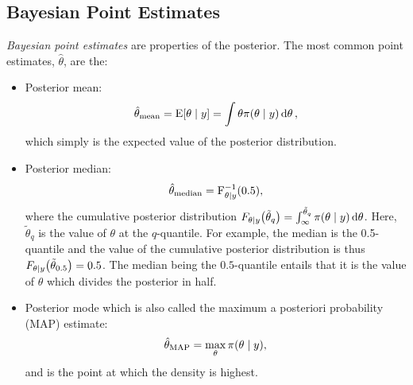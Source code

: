\subsection{Bayesian Point Estimates}

\textit{Bayesian point estimates} are properties of the posterior. The most common point estimates, $\hat{\theta}$, are the:

\begin{itemize}
    \item Posterior mean: 
    \begin{equation}\label{eq:posterior_mean}
        \hat{\theta}_\mathrm{mean} = \mathrm{E} \qty[\theta \mid y] = \int \theta \pi \qty(\theta \mid y) \dd{\theta}, 
    \end{equation}
    which simply is the expected value of the posterior distribution. 
    \item Posterior median: 
    \begin{equation}\label{eq:posterior_median}
        \hat{\theta}_\mathrm{median} = \mathrm{F}_{\theta \mid y}^{-1} \qty(0.5),
    \end{equation}
    where the cumulative posterior distribution $F_{\theta \mid y} \qty(\tilde{\theta}_q) = \int_{\infty}^{\tilde{\theta}_q} \pi \qty(\theta \mid y) \dd{\theta}$. Here, $\tilde{\theta}_q$ is the value of $\theta$ at the $q$-quantile. For example, the median is the 0.5-quantile and the value of the cumulative posterior distribution is thus $F_{\theta \mid y} \qty(\tilde{\theta}_{0.5}) = 0.5$. The median being the $0.5$-quantile entails that it is the value of $\theta$ which divides the posterior in half.
    \item Posterior mode which is also called the maximum a posteriori probability (MAP) estimate: 
    \begin{equation}\label{eq:posterior_map}
        \hat{\theta}_\mathrm{MAP} = \max_\theta \pi \qty(\theta \mid y),
    \end{equation}
    and is the point at which the density is highest. 
\end{itemize}

